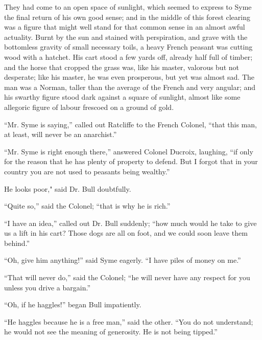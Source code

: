 \documentclass{book}
\begin{document}
They had come to an open space of sunlight, which seemed to express to Syme the final return of his own good sense; and in the middle of this forest clearing was a figure that might well stand for that common sense in an almost awful actuality. Burnt by the sun and stained with perspiration, and grave with the bottomless gravity of small necessary toils, a heavy French peasant was cutting wood with a hatchet. His cart stood a few yards off, already half full of timber; and the horse that cropped the grass was, like his master, valorous but not desperate; like his master, he was even prosperous, but yet was almost sad. The man was a Norman, taller than the average of the French and very angular; and his swarthy figure stood dark against a square of sunlight, almost like some allegoric figure of labour frescoed on a ground of gold.

“Mr. Syme is saying,” called out Ratcliffe to the French Colonel, “that this man, at least, will never be an anarchist.”

“Mr. Syme is right enough there,” answered Colonel Ducroix, laughing, “if only for the reason that he has plenty of property to defend. But I forgot that in your country you are not used to peasants being wealthy.”

He looks poor," said Dr. Bull doubtfully.

“Quite so,” said the Colonel; “that is why he is rich.”

“I have an idea,” called out Dr. Bull suddenly; “how much would he take to give us a lift in his cart? Those dogs are all on foot, and we could soon leave them behind.”

“Oh, give him anything!” said Syme eagerly. “I have piles of money on me.”

“That will never do,” said the Colonel; “he will never have any respect for you unless you drive a bargain.”

“Oh, if he haggles!” began Bull impatiently.

“He haggles because he is a free man,” said the other. “You do not understand; he would not see the meaning of generosity. He is not being tipped.”
\end{document}
